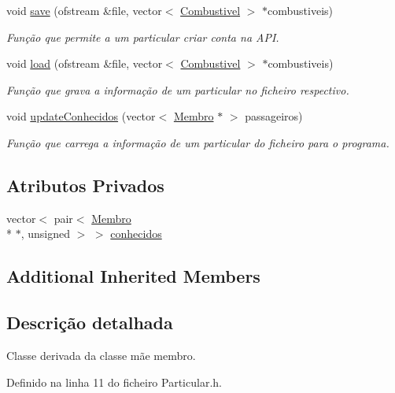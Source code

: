 \begin{DoxyCompactItemize}
void \hyperlink{class_particular_a3925d68794b2e91a9c46346e5110b013}{save} (ofstream \&file, vector$<$ \hyperlink{class_combustivel}{Combustivel} $>$ $\ast$combustiveis)
\begin{DoxyCompactList}\small\item\em Função que permite a um particular criar conta na A\+P\+I. \end{DoxyCompactList}\item 
void \hyperlink{class_particular_a1da22ddfc6b6fc1c562cf4dcdc649e2a}{load} (ofstream \&file, vector$<$ \hyperlink{class_combustivel}{Combustivel} $>$ $\ast$combustiveis)
\begin{DoxyCompactList}\small\item\em Função que grava a informação de um particular no ficheiro respectivo. \end{DoxyCompactList}\item 
void \hyperlink{class_particular_a544f2ee62236cd4734aa6a7e9848fbae}{update\+Conhecidos} (vector$<$ \hyperlink{class_membro}{Membro} $\ast$ $>$ passageiros)
\begin{DoxyCompactList}\small\item\em Função que carrega a informação de um particular do ficheiro para o programa. \end{DoxyCompactList}\end{DoxyCompactItemize}
\subsection*{Atributos Privados}
\begin{DoxyCompactItemize}
\item 
vector$<$ pair$<$ \hyperlink{class_membro}{Membro} \\*
$\ast$, unsigned $>$ $>$ \hyperlink{class_particular_aa7275585be06abbb131d9acda989847d}{conhecidos}
\end{DoxyCompactItemize}
\subsection*{Additional Inherited Members}


\subsection{Descrição detalhada}
Classe derivada da classe mãe membro. 

Definido na linha 11 do ficheiro Particular.\+h.



